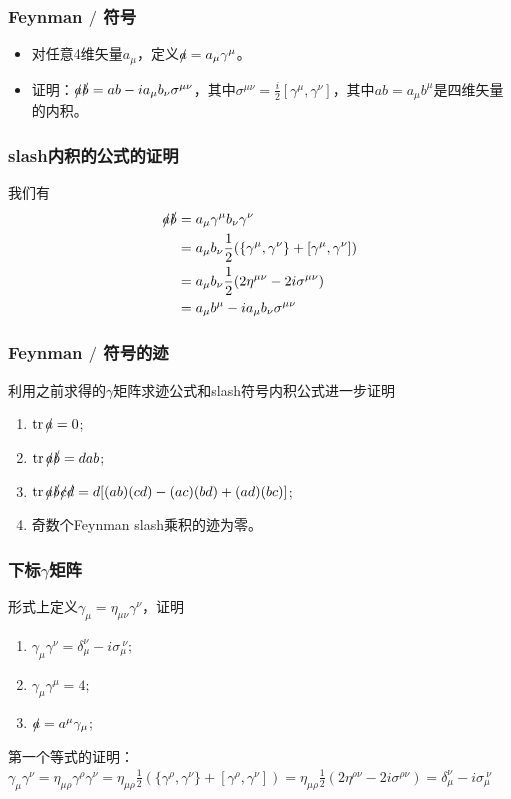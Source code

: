 \documentclass[aspectratio=1610,14pt,matheuler]{beamer}
\newcommand{\bch}{}
\newcommand{\ech}{}
\DeclareMathOperator{\tr}{tr}
\begin{document}
\begin{frame}
\frametitle{\bch Feynman $\slash$ 符号 \ech}
\bch
\begin{itemize}
\item
对任意4维矢量$a_\mu$，定义$\slashed{a} = a_\mu \gamma^\mu$。
\item
证明：$\slashed a \slashed b = ab - i a_\mu b_\nu \sigma^{\mu \nu}$，其中$\sigma^{\mu \nu} = \frac{i}{2}[\gamma^\mu ,\gamma^\nu]$，其中$ab = a_\mu b^\mu$是四维矢量的内积。
\end{itemize}
\ech
\end{frame}


\begin{frame}
\frametitle{\bch slash内积的公式的证明 \ech}
\bch
我们有
\begin{equation*}
\begin{aligned}
\slashed a \slashed b &= a_\mu \gamma^\mu b_\nu \gamma^\nu \\
&= a_\mu b_\nu \frac{1}{2}(\{\gamma^\mu,\gamma^\nu\} + [\gamma^\mu,\gamma^\nu])\\
&= a_\mu b_\nu \frac{1}{2} (2\eta^{\mu \nu} - 2i\sigma^{\mu \nu}) \\
&= a_\mu b^\mu - ia_\mu b_\nu \sigma^{\mu \nu}
\end{aligned}
\end{equation*}
\ech
\end{frame}


\begin{frame}
\frametitle{\bch Feynman $\slash$ 符号的迹 \ech}
\bch
利用之前求得的$\gamma$矩阵求迹公式和slash符号内积公式进一步证明
\begin{enumerate}
\item $\tr \slashed a = 0$;
\item $\tr \slashed a \slashed b = d ab$;
\item $\tr \slashed a \slashed b \slashed c \slashed d = d[(ab)(cd) - (ac)(bd) + (ad)(bc)]$;
\item 奇数个Feynman slash乘积的迹为零。
\end{enumerate}
\ech
\end{frame}

\begin{frame}
\frametitle{\bch 下标$\gamma$矩阵 \ech}
\bch
形式上定义$\gamma_\mu = \eta_{\mu \nu} \gamma^\nu$，证明
\begin{enumerate}
\item $\gamma_\mu \gamma^\nu = \delta_\mu^\nu -i \sigma_\mu^{\ \nu}$;
\item $\gamma_\mu \gamma^\mu = 4$;
\item $\slashed a = a^\mu \gamma_\mu$;
\end{enumerate}
第一个等式的证明：{\color{white} $\gamma_\mu \gamma^\nu = \eta_{\mu \rho} \gamma^\rho \gamma^\nu = \eta_{\mu \rho} \frac{1}{2} ( \{\gamma^\rho,\gamma^\nu\} + [\gamma^\rho,\gamma^\nu]) = \eta_{\mu \rho} \frac{1}{2} (2\eta^{\rho \nu} - 2i \sigma^{\rho \nu}) = \delta_\mu^\nu -i \sigma_\mu^{\ \nu}$}
\ech
\end{frame}
\end{document}
